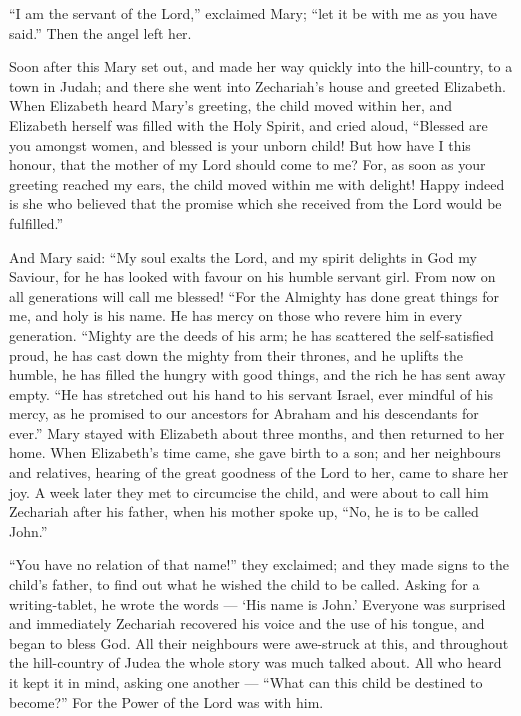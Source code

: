  ``I am the servant of the Lord,'' exclaimed Mary; ``let it
be with me as you have said.'' Then the angel left her.

 Soon after this Mary set out, and made her way quickly
into the hill-country, to a town in Judah;  and there she
went into Zechariah's house and greeted Elizabeth.  When
Elizabeth heard Mary's greeting, the child moved within her, and
Elizabeth herself was filled with the Holy Spirit,  and
cried aloud, ``Blessed are you amongst women, and blessed is your unborn
child!  But how have I this honour, that the mother of my
Lord should come to me?  For, as soon as your greeting
reached my ears, the child moved within me with delight! 
Happy indeed is she who believed that the promise which she received
from the Lord would be fulfilled.''

 And Mary said: ``My soul exalts the Lord, 
and my spirit delights in God my Saviour,  for he has
looked with favour on his humble servant girl. From now on all
generations will call me blessed!  ``For the Almighty has
done great things for me, and holy is his name.  He has
mercy on those who revere him in every generation. 
``Mighty are the deeds of his arm; he has scattered the self-satisfied
proud,  he has cast down the mighty from their thrones, and
he uplifts the humble,  he has filled the hungry with good
things, and the rich he has sent away empty.  ``He has
stretched out his hand to his servant Israel, ever mindful of his mercy,
 as he promised to our ancestors for Abraham and his
descendants for ever.''  Mary stayed with Elizabeth about
three months, and then returned to her home.  When
Elizabeth's time came, she gave birth to a son;  and her
neighbours and relatives, hearing of the great goodness of the Lord to
her, came to share her joy.  A week later they met to
circumcise the child, and were about to call him Zechariah after his
father,  when his mother spoke up, ``No, he is to be called
John.''

 ``You have no relation of that name!'' they exclaimed;
 and they made signs to the child's father, to find out
what he wished the child to be called.  Asking for a
writing-tablet, he wrote the words --- `His name is John.' Everyone was
surprised  and immediately Zechariah recovered his voice
and the use of his tongue, and began to bless God.  All
their neighbours were awe-struck at this, and throughout the
hill-country of Judea the whole story was much talked about.
 All who heard it kept it in mind, asking one another ---
``What can this child be destined to become?'' For the Power of the Lord
was with him.


